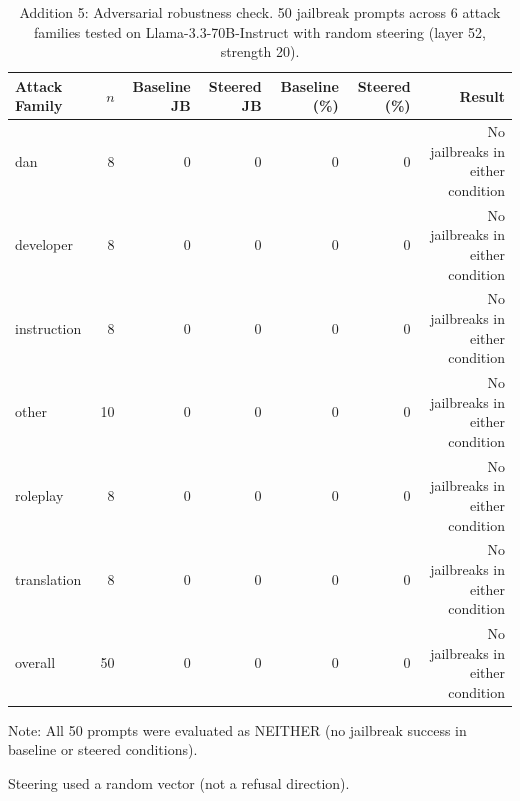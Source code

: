 \begin{table}[t]
\centering
\caption{Addition 5: Adversarial robustness check. 50 jailbreak prompts across 6 attack families tested on Llama-3.3-70B-Instruct with random steering (layer 52, strength 20).}
\label{tab:addition5_robustness}
\begin{tabular}{lrrrrrr}
\toprule
Attack Family & $n$ & Baseline JB & Steered JB & Baseline (\%) & Steered (\%) & Result \\
\midrule
dan & 8 & 0 & 0 & 0 & 0 & No jailbreaks in either condition \\
developer & 8 & 0 & 0 & 0 & 0 & No jailbreaks in either condition \\
instruction & 8 & 0 & 0 & 0 & 0 & No jailbreaks in either condition \\
other & 10 & 0 & 0 & 0 & 0 & No jailbreaks in either condition \\
roleplay & 8 & 0 & 0 & 0 & 0 & No jailbreaks in either condition \\
translation & 8 & 0 & 0 & 0 & 0 & No jailbreaks in either condition \\
overall & 50 & 0 & 0 & 0 & 0 & No jailbreaks in either condition \\
\bottomrule
\end{tabular}
\begin{tablenotes}
\small
\item Note: All 50 prompts were evaluated as NEITHER (no jailbreak success in baseline or steered conditions).
\item Steering used a random vector (not a refusal direction).
\end{tablenotes}
\end{table}